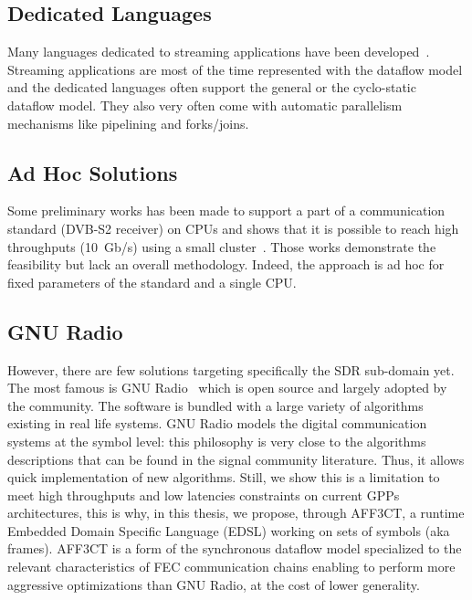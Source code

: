 \subsection{Dedicated Languages}

Many languages dedicated to streaming applications have been
developed~\cite{Buck2004,Amarasinghe2005,Liao2006,Black-Schaffer2010,Glitia2010,
Thies2010,DeOliveiraCastro2017}. Streaming applications are most of the time
represented with the dataflow model and the dedicated languages often support
the general or the cyclo-static dataflow model. They also very often come with
automatic parallelism mechanisms like pipelining and forks/joins.

\subsection{Ad Hoc Solutions}

Some preliminary works has been made to support a part of a communication
standard (DVB-S2 receiver) on CPUs and shows that it is possible to reach high
throughputs (10~Gb/s) using a small cluster~\cite{Grayver2020}. Those works
demonstrate the feasibility but lack an overall methodology. Indeed, the
approach is ad hoc for fixed parameters of the standard and a single CPU.

\subsection{GNU Radio}

However, there are few solutions targeting specifically the SDR sub-domain yet.
The most famous is GNU Radio~\cite{GNURadio} which is open source and largely
adopted by the community. The software is bundled with a large variety of
algorithms existing in real life systems. GNU Radio models the digital
communication systems at the symbol level: this philosophy is very close to the
algorithms descriptions that can be found in the signal community literature.
Thus, it allows quick implementation of new algorithms. Still, we show this is a
limitation to meet high throughputs and low latencies constraints on current
GPPs architectures, this is why, in this thesis, we propose, through AFF3CT, a
runtime Embedded Domain Specific Language (EDSL) working on sets of symbols
(aka frames). AFF3CT is a form of the synchronous dataflow model specialized to
the relevant characteristics of FEC communication chains enabling to perform
more aggressive optimizations than GNU Radio, at the cost of lower generality.


